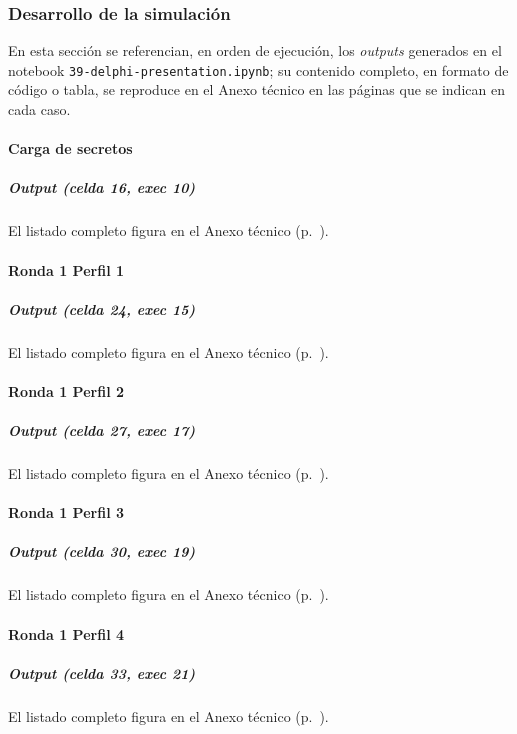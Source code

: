 \subsubsection{Desarrollo de la simulación}
En esta sección se referencian, en orden de ejecución, los \textit{outputs} generados en el notebook \texttt{39-delphi-presentation.ipynb}; su contenido completo, en formato de código o tabla, se reproduce en el Anexo técnico en las páginas que se indican en cada caso.

\paragraph{Carga de secretos}

\subparagraph{Output (celda 16, exec 10)}
El listado completo figura en el Anexo técnico (p.~\pageref{anexo:code-6-3-2-1}).


\paragraph{Ronda 1 Perfil 1}

\subparagraph{Output (celda 24, exec 15)}
El listado completo figura en el Anexo técnico (p.~\pageref{anexo:code-6-3-2-2}).


\paragraph{Ronda 1 Perfil 2}

\subparagraph{Output (celda 27, exec 17)}
El listado completo figura en el Anexo técnico (p.~\pageref{anexo:code-6-3-2-3}).


\paragraph{Ronda 1 Perfil 3}

\subparagraph{Output (celda 30, exec 19)}
El listado completo figura en el Anexo técnico (p.~\pageref{anexo:code-6-3-2-4}).


\paragraph{Ronda 1 Perfil 4}

\subparagraph{Output (celda 33, exec 21)}
El listado completo figura en el Anexo técnico (p.~\pageref{anexo:code-6-3-2-5}).

